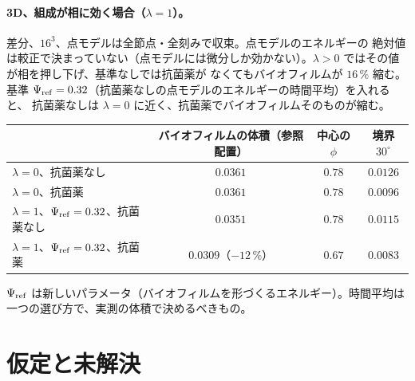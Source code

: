 \documentclass[11pt,a4paper]{article}
\theoremstyle{definition}
\begin{document}
\paragraph{3D、組成が相に効く場合（$\lambda=1$）。} 差分、$16^3$、点モデルは全節点・全刻みで収束。点モデルのエネルギーの
絶対値は較正で決まっていない（点モデルには微分しか効かない）。$\lambda>0$ ではその値が相を押し下げ、基準なしでは抗菌薬が
なくてもバイオフィルムが $16\,\%$ 縮む。基準 $\Psi_{\rm ref}=0.32$（抗菌薬なしの点モデルのエネルギーの時間平均）を入れると、
抗菌薬なしは $\lambda=0$ に近く、抗菌薬でバイオフィルムそのものが縮む。
\begin{center}\small
\begin{tabularx}{\linewidth}{@{}Yccc@{}}
\toprule
& バイオフィルムの体積（参照配置） & 中心の $\phi$ & 境界 $30^\circ$\\
\midrule
$\lambda=0$、抗菌薬なし & $0.0361$ & $0.78$ & $0.0126$\\
$\lambda=0$、抗菌薬 & $0.0361$ & $0.78$ & $0.0096$\\
$\lambda=1$、$\Psi_{\rm ref}=0.32$、抗菌薬なし & $0.0351$ & $0.78$ & $0.0115$\\
$\lambda=1$、$\Psi_{\rm ref}=0.32$、抗菌薬 & $0.0309$（$-12\,\%$） & $0.67$ & $0.0083$\\
\bottomrule
\end{tabularx}
\end{center}
$\Psi_{\rm ref}$ は新しいパラメータ（バイオフィルムを形づくるエネルギー）。時間平均は一つの選び方で、実測の体積で決めるべきもの。

\section{仮定と未解決}
\end{document}

